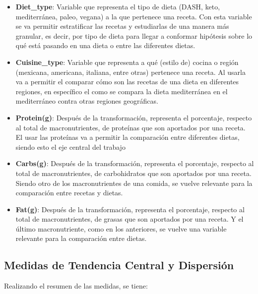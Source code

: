 \documentclass[12pt,a4paper]{article}
\begin{document}
        \begin{itemize}[label=\textbullet]

            \item \textbf{Diet\_type}: Variable que representa el tipo de 
            dieta (DASH, keto, mediterránea, paleo, vegana) a la que 
            pertenece una receta. Con esta variable se va permitir estratificar 
            las recetas y estudiarlas de una manera más granular, es decir, 
            por tipo de dieta para llegar a conformar hipótesis sobre lo qué 
            está pasando en una dieta o entre las diferentes dietas.

            \item \textbf{Cuisine\_type}: Variable que representa a qué (estilo 
            de) cocina o región (mexicana, americana, italiana, entre otras) pertenece una 
            receta. Al usarla va a permitir el comparar cómo son las recetas 
            de una dieta en diferentes regiones, en específico el 
            como se compara la dieta mediterránea en el mediterráneo  
            contra otras regiones geográficas.

            \item \textbf{Protein(g)}: Después de la transformación, representa el 
            porcentaje, respecto al total de macronutrientes, de proteínas que son 
            aportados por una receta. El usar las proteínas va a permitir la 
            comparación entre diferentes dietas, siendo esto el eje central del trabajo

            \item \textbf{Carbs(g)}: Después de la transformación, representa el 
            porcentaje, respecto al total de macronutrientes, de carbohidratos que 
            son aportados por una receta. Siendo otro de los macronutrientes de una 
            comida, se vuelve relevante para la comparación entre recetas y dietas.

            \item \textbf{Fat(g)}: Después de la transformación, representa el 
            porcentaje, respecto al total de macronutrientes, de grasas que son 
            aportados por una receta. Y el último macronutriente, como en los 
            anteriores, se vuelve una variable relevante para la comparación entre dietas.
        \end{itemize}

    \subsection{Medidas de Tendencia Central y Dispersión}
        Realizando el resumen de las medidas, se tiene:
\end{document}

